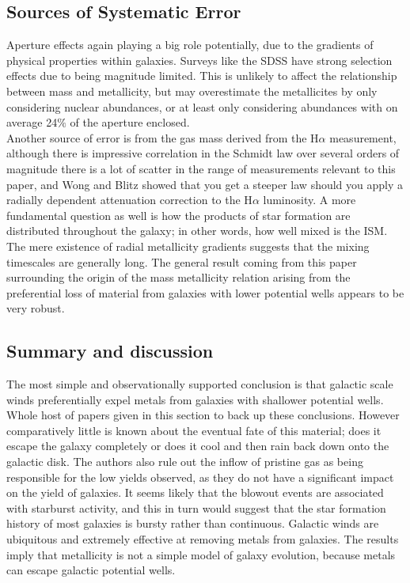 \documentclass{literature}
\begin{document}
\subsection{Sources of Systematic Error}
Aperture effects again playing a big role potentially, due to the gradients of physical properties within galaxies. Surveys like the SDSS have strong selection effects due to being magnitude limited. This is unlikely to affect the relationship between mass and metallicity, but may overestimate the metallicites by only considering nuclear abundances, or at least only considering abundances with on average 24$\%$ of the aperture enclosed. \\ 
Another source of error is from the gas mass derived from the H$\alpha$ measurement, although there is impressive correlation in the Schmidt law over several orders of magnitude there is a lot of scatter in the range of measurements relevant to this paper, and Wong and Blitz \citep{Wong_2002} showed that you get a steeper law should you apply a radially dependent attenuation correction to the H$\alpha$ luminosity. A more fundamental question as well is how the products of star formation are distributed throughout the galaxy; in other words, how well mixed is the ISM. The mere existence of radial metallicity gradients suggests that the mixing timescales are generally long. The general result coming from this paper surrounding the origin of the mass metallicity relation arising from the preferential loss of material from galaxies with lower potential wells appears to be very robust. 
\subsection{Summary and discussion}
The most simple and observationally supported conclusion is that galactic scale winds preferentially expel metals from galaxies with shallower potential wells. Whole host of papers given in this section to back up these conclusions. However comparatively little is known about the eventual fate of this material; does it escape the galaxy completely or does it cool and then rain back down onto the galactic disk. The authors also rule out the inflow of pristine gas as being responsible for the low yields observed, as they do not have a significant impact on the yield of galaxies. It seems likely that the blowout events are associated with starburst activity, and this in turn would suggest that the star formation history of most galaxies is bursty rather than continuous. Galactic winds are ubiquitous and extremely effective at removing metals from galaxies. The results imply that metallicity is not a simple model of galaxy evolution, because metals can escape galactic potential wells. 
\end{document}

